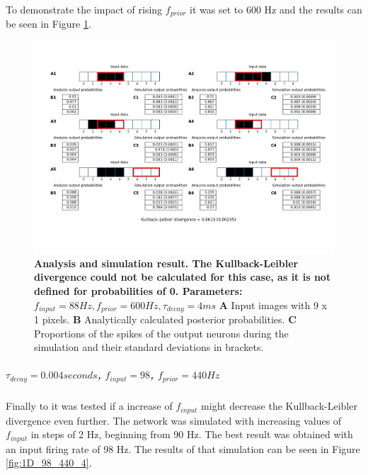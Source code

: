 To demonstrate the impact of rising $f_{prior}$ it was set to 600 Hz and the results can be seen in Figure \ref{fig:1D_88_600_4}.

\begin{figure}
  \includegraphics[width=\linewidth]{figures/1D/1D_88_600_4.png}
  \caption{\textbf{Analysis and simulation result. The Kullback-Leibler divergence could not be calculated for this case, as it is not defined for probabilities of 0. Parameters: } $f_{input} = 88 Hz, f_{prior} = 600 Hz, \tau_{decay} = 4 ms$ \textbf{A} Input images with 9 x 1 pixels. \textbf{B} Analytically calculated posterior probabilities. \textbf{C} Proportions of the spikes of the output neurons during the simulation and their standard deviations in brackets.}
  \label{fig:1D_88_600_4}
\end{figure}

\subparagraph{$\tau_{decay} = 0.004 seconds$, $f_{input} = 98$, $f_{prior} = 440 Hz$}
Finally to it was tested if a increase of $f_{input}$ might decrease the Kullback-Leibler divergence even further. The network was simulated with increasing values of $f_{input}$ in steps of 2 Hz, beginning from 90 Hz. The best result was obtained with an input firing rate of 98 Hz. The results of that simulation can be seen in Figure \ref{fig:1D_98_440_4}.

